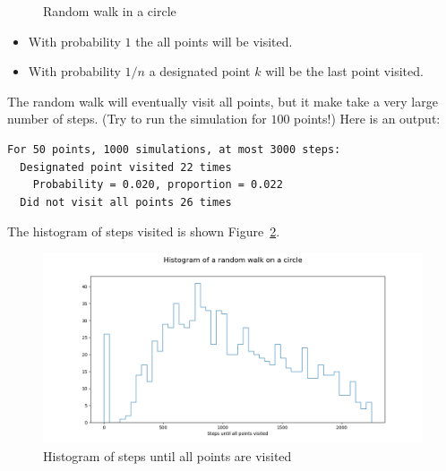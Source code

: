 \documentclass[11pt,a4paper]{article}
\begin{document}
\begin{figure}
\begin{center}
\end{center}
\caption{Random walk in a circle}\label{f.random-walk-circle}
\end{figure}

\begin{itemize}
\item With probability $1$ the all points will be visited.
\item With probability $1/n$ a designated point $k$ will be the last point visited.
\end{itemize}

The random walk will eventually visit all points, but it make take a very large number of steps. (Try to run the simulation for $100$ points!) Here is an output:
\begin{verbatim}
For 50 points, 1000 simulations, at most 3000 steps:
  Designated point visited 22 times
    Probability = 0.020, proportion = 0.022
  Did not visit all points 26 times
\end{verbatim}
The histogram of steps visited is shown Figure~\ref{f.random-walk-circle-histogram}. 
\begin{figure}
\begin{center}
\includegraphics[width=\textwidth]{random-walk-circle}
\caption{Histogram of steps until all points are visited}\label{f.random-walk-circle-histogram}
\end{center}
\end{figure}
\end{document}
